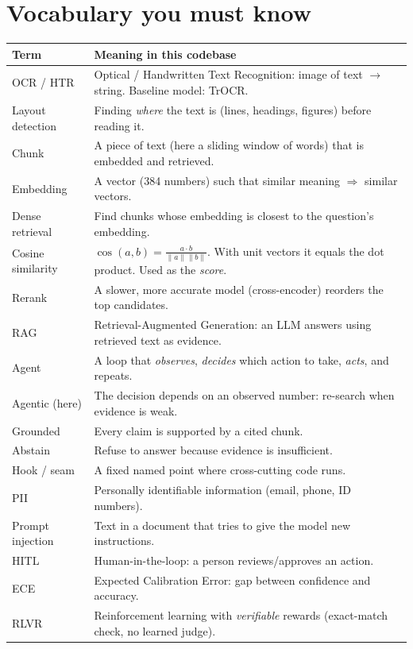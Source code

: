 \section{Vocabulary you must know}
\begin{longtable}{@{}p{3.2cm}p{11.3cm}@{}}
\toprule \textbf{Term} & \textbf{Meaning in this codebase} \\ \midrule \endhead
OCR / HTR & Optical / Handwritten Text Recognition: image of text $\to$ string. Baseline model: TrOCR. \\
Layout detection & Finding \emph{where} the text is (lines, headings, figures) before reading it. \\
Chunk & A piece of text (here a sliding window of words) that is embedded and retrieved. \\
Embedding & A vector (384 numbers) such that similar meaning $\Rightarrow$ similar vectors. \\
Dense retrieval & Find chunks whose embedding is closest to the question's embedding. \\
Cosine similarity & $\cos(a,b)=\frac{a\cdot b}{\|a\|\|b\|}$. With unit vectors it equals the dot product. Used as the \emph{score}. \\
Rerank & A slower, more accurate model (cross-encoder) reorders the top candidates. \\
RAG & Retrieval-Augmented Generation: an LLM answers using retrieved text as evidence. \\
Agent & A loop that \emph{observes}, \emph{decides} which action to take, \emph{acts}, and repeats. \\
Agentic (here) & The decision depends on an observed number: re-search when evidence is weak. \\
Grounded & Every claim is supported by a cited chunk. \\
Abstain & Refuse to answer because evidence is insufficient. \\
Hook / seam & A fixed named point where cross-cutting code runs. \\
PII & Personally identifiable information (email, phone, ID numbers). \\
Prompt injection & Text in a document that tries to give the model new instructions. \\
HITL & Human-in-the-loop: a person reviews/approves an action. \\
ECE & Expected Calibration Error: gap between confidence and accuracy. \\
RLVR & Reinforcement learning with \emph{verifiable} rewards (exact-match check, no learned judge). \\
\bottomrule
\end{longtable}

